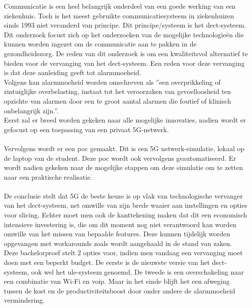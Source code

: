 Communicatie is een heel belangrijk onderdeel van een goede werking van een ziekenhuis. Toch is het meest gebruikte communicatiesysteem in ziekenhuizen sinds 1993 niet veranderd van principe. Dit principe/systeem is het \gls{dect}-systeem. Dit onderzoek focust zich op het onderzoeken van de mogelijke technologieën die kunnen worden ingezet om de communicatie aan te pakken in de gezondheidszorg. De reden van dit onderzoek is om een kwaliteitsvol alternatief te bieden voor de vervanging van het \gls{dect}-systeem. Een reden voor deze vervanging is dat deze aanleiding geeft tot alarmmoeheid.\\
Volgens \textcite{Ferrara2023} kan alarmmoeheid worden omschreven als ''een overprikkeling of zintuiglijke overbelasting, instaat tot het veroorzaken van gevoelloosheid ten opzichte van alarmen door een te groot aantal alarmen die foutief of klinisch onbelangrijk zijn.''.\\ Eerst zal er breed worden gekeken naar alle mogelijke innovaties, nadien wordt er gefocust op een toepassing van een privaat 5G-netwerk. \\\\
Vervolgens wordt er een \gls{poc} gemaakt. Dit is een 5G netwerk-simulatie, lokaal op de laptop van de student. Deze \gls{poc} wordt ook vervolgens geautomatiseerd. Er wordt nadien gekeken naar de mogelijke stappen om deze simulatie om te zetten naar een praktische realisatie.\\\\
De conclusie stelt dat 5G de beste keuze is op vlak van technologische vervanger van het \gls{dect}-systeem, net omwille van zijn brede waaier aan instellingen en opties voor slicing. Echter moet men ook de kanttekening maken dat dit een economisch intensieve investering is, die om dit moment nog niet verantwoord kan worden omwille van het missen van bepaalde features. Deze kunnen tijdelijk worden opgevangen met workarounds zoals wordt aangehaald in de stand van zaken. Deze bachelorproef stelt 2 opties voor, indien men vandaag een vervanging moet doen met een beperkt budget. De eerste is de nieuwste versie van het \gls{dect}-systeem, ook wel het \gls{ule}-systeem genoemd. De tweede is een overschakeling naar een combinatie van Wi-Fi en \gls{voip}. Maar in het einde blijft het een afweging tussen de kost en de productiviteitsboost door onder andere de alarmmoeheid vermindering.
